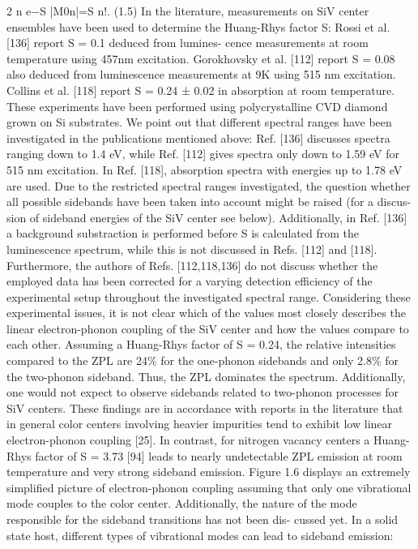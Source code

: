       2 n e−S
      |M0n|=S n!. (1.5)
      In the literature, measurements on SiV center ensembles have been used to determine the Huang-Rhys factor S: Rossi et al. [136] report S = 0.1 deduced from lumines- cence measurements at room temperature using 457nm excitation. Gorokhovsky et al. [112] report S = 0.08 also deduced from luminescence measurements at 9K using 515 nm excitation. Collins et al. [118] report S = 0.24 ± 0.02 in absorption at room temperature. These experiments have been performed using polycrystalline CVD diamond grown on Si substrates. We point out that different spectral ranges have been investigated in the publications mentioned above: Ref. [136] discusses spectra ranging down to 1.4 eV, while Ref. [112] gives spectra only down to 1.59 eV for 515 nm excitation. In Ref. [118], absorption spectra with energies up to 1.78 eV are used. Due to the restricted spectral ranges investigated, the question whether all possible sidebands have been taken into account might be raised (for a discus- sion of sideband energies of the SiV center see below). Additionally, in Ref. [136] a background substraction is performed before S is calculated from the luminescence spectrum, while this is not discussed in Refs. [112] and [118]. Furthermore, the authors of Refs. [112,118,136] do not discuss whether the employed data has been corrected for a varying detection efficiency of the experimental setup throughout the investigated spectral range. Considering these experimental issues, it is not clear which of the values most closely describes the linear electron-phonon coupling of the SiV center and how the values compare to each other.
      Assuming a Huang-Rhys factor of S = 0.24, the relative intensities compared to the ZPL are 24\% for the one-phonon sidebands and only 2.8\% for the two-phonon sideband. Thus, the ZPL dominates the spectrum. Additionally, one would not expect to observe sidebands related to two-phonon processes for SiV centers. These findings are in accordance with reports in the literature that in general color centers involving heavier impurities tend to exhibit low linear electron-phonon coupling [25]. In contrast, for nitrogen vacancy centers a Huang-Rhys factor of S = 3.73 [94] leads to nearly undetectable ZPL emission at room temperature and very strong sideband emission.
      Figure 1.6 displays an extremely simplified picture of electron-phonon coupling assuming that only one vibrational mode couples to the color center. Additionally, the nature of the mode responsible for the sideband transitions has not been dis- cussed yet. In a solid state host, different types of vibrational modes can lead to sideband emission:
